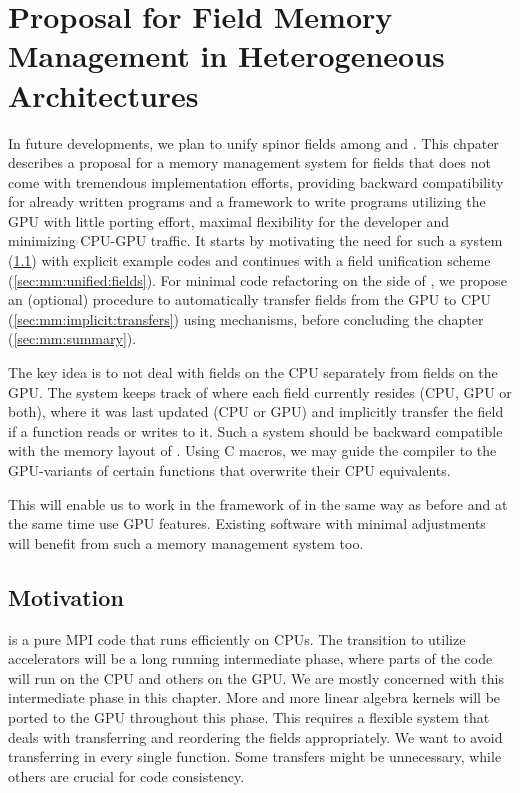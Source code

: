 \chapter{Proposal for Field Memory Management in Heterogeneous Architectures}
\label{ch:p1:memory}


In future developments, we plan to unify spinor fields among \openqxd and \quda.
This chpater describes a proposal for a memory management system for fields that does not come with tremendous implementation efforts, providing backward compatibility for already written programs and a framework to write programs utilizing the GPU with little porting effort, maximal flexibility for the developer and minimizing CPU-GPU traffic.
It starts by motivating the need for such a system (\cref{sec:mm:motivation}) with explicit example codes and continues with a field unification scheme (\cref{sec:mm:unified:fields}).
For minimal code refactoring on the side of \openqxd, we propose an (optional) procedure to automatically transfer fields from the GPU to CPU (\cref{sec:mm:implicit:transfers}) using \posix mechanisms, before concluding the chapter (\cref{sec:mm:summary}).

The key idea is to not deal with fields on the CPU separately from fields on the GPU.
The system  keeps track of where each field currently resides (CPU, GPU or both), where it was last updated (CPU or GPU) and implicitly transfer the field if a function reads or writes to it.
Such a system should be backward compatible with the memory layout of \openqxd.
Using C macros, we may guide the compiler to the GPU-variants of certain functions that overwrite their CPU equivalents.

This will enable us to work in the framework of \openqxd in the same way as before and at the same time use GPU features. 
Existing software with minimal adjustments will benefit from such a memory management system too.

\section{Motivation}
\label{sec:mm:motivation}

\Openqxd is a pure MPI code that runs efficiently on CPUs.
The transition to utilize accelerators will be a long running intermediate phase, where parts of the code will run on the CPU and others on the GPU.
We are mostly concerned with this intermediate phase in this chapter.
More and more linear algebra kernels will be ported to the GPU throughout this phase.
This requires a flexible system that deals with transferring and reordering the fields appropriately.
We want to avoid transferring in every single function.
Some transfers might be unnecessary, while others are crucial for code consistency.

